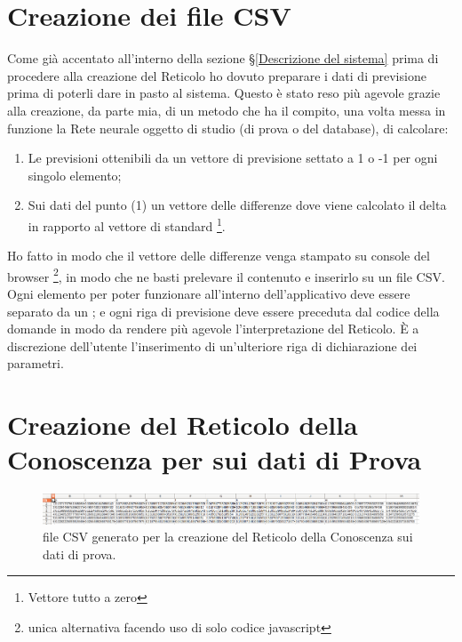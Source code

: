 \section{Creazione dei file CSV}
\label{Creazione dei file CSV}
Come gi\`a accentato all'interno della sezione §\ref{Descrizione del sistema} prima di procedere alla creazione del Reticolo ho dovuto preparare i dati di previsione prima di poterli dare in pasto al sistema. Questo \`e stato reso pi\`u agevole grazie alla creazione, da parte mia, di un metodo che ha il compito, una volta messa in funzione la Rete neurale oggetto di studio (di prova o del database), di calcolare:
\begin{enumerate}
\item Le previsioni ottenibili da un vettore di previsione settato a 1 o -1 per ogni singolo elemento;
\item Sui dati del punto (1) un vettore delle differenze dove viene calcolato il delta in rapporto al vettore di standard \footnote{Vettore tutto a zero}.
\end{enumerate}
\noindent
Ho fatto in modo che il vettore delle differenze venga stampato su console del browser \footnote{unica alternativa facendo uso di solo codice javascript}, in modo che ne basti prelevare il contenuto e inserirlo su un file CSV. Ogni elemento per poter funzionare all'interno dell'applicativo deve essere separato da un ; e ogni riga di previsione deve essere preceduta dal codice della domande in modo da rendere pi\`u agevole l'interpretazione del Reticolo. \`E a discrezione dell'utente l'inserimento di un'ulteriore riga di dichiarazione dei parametri.

\section{Creazione del Reticolo della Conoscenza per sui dati di Prova}
\label{Creazione del Reticolo della Conoscenza per sui dati di Prova}
\noindent
\begin{figure}[H]
\centering
	\includegraphics[width=1\linewidth]{./image/fileCSV_rete-prova.png}
	\caption{file CSV generato per la creazione del Reticolo della Conoscenza sui dati di prova.}
	\label{file CSV generato per la creazione del Reticolo della Conoscenza sui dati di prova.}
\end{figure}
\noindent

